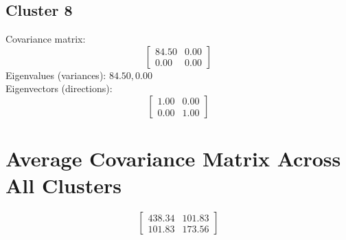 \documentclass{article}
\begin{document}
\subsection*{Cluster 8}
Covariance matrix:
\[\begin{bmatrix}84.50 & 0.00 \\0.00 & 0.00\end{bmatrix}\]
Eigenvalues (variances): $ 84.50, $0.00\\
Eigenvectors (directions):
\[\begin{bmatrix}1.00 & 0.00 \\0.00 & 1.00\end{bmatrix}\]
\section*{Average Covariance Matrix Across All Clusters}
\[\begin{bmatrix}438.34 & 101.83 \\101.83 & 173.56\end{bmatrix}\]
\end{document}
